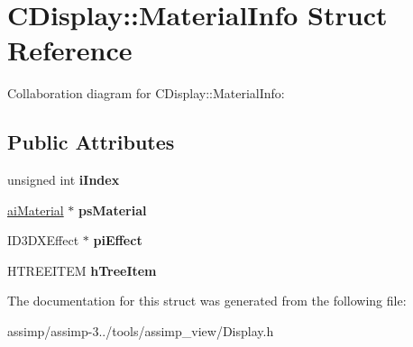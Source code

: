 \hypertarget{struct_c_display_1_1_material_info}{\section{C\+Display\+:\+:Material\+Info Struct Reference}
\label{struct_c_display_1_1_material_info}
}


Collaboration diagram for C\+Display\+:\+:Material\+Info\+:
\subsection*{Public Attributes}
\begin{DoxyCompactItemize}
\item 
\hypertarget{struct_c_display_1_1_material_info_a54f6d3a395492bec46959bab4a6c87b4}{unsigned int {\bfseries i\+Index}}\label{struct_c_display_1_1_material_info_a54f6d3a395492bec46959bab4a6c87b4}

\item 
\hypertarget{struct_c_display_1_1_material_info_a140440c7acf0412506f89663b646aead}{\hyperlink{classai_material}{ai\+Material} $\ast$ {\bfseries ps\+Material}}\label{struct_c_display_1_1_material_info_a140440c7acf0412506f89663b646aead}

\item 
\hypertarget{struct_c_display_1_1_material_info_ae057be544846392cc9a0fde10c118a9c}{I\+D3\+D\+X\+Effect $\ast$ {\bfseries pi\+Effect}}\label{struct_c_display_1_1_material_info_ae057be544846392cc9a0fde10c118a9c}

\item 
\hypertarget{struct_c_display_1_1_material_info_a975ad07ffb30bb306a2e909066c66b3d}{H\+T\+R\+E\+E\+I\+T\+E\+M {\bfseries h\+Tree\+Item}}\label{struct_c_display_1_1_material_info_a975ad07ffb30bb306a2e909066c66b3d}

\end{DoxyCompactItemize}


The documentation for this struct was generated from the following file\+:\begin{DoxyCompactItemize}
\item 
assimp/assimp-\/3../tools/assimp\+\_\+view/Display.\+h\end{DoxyCompactItemize}
